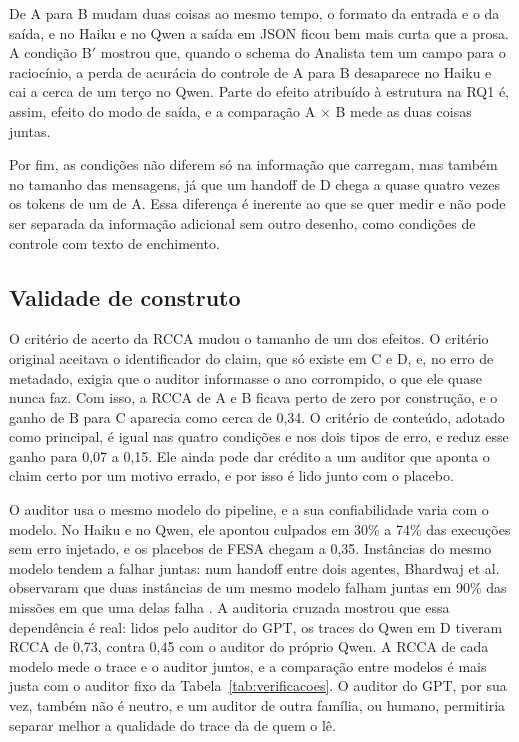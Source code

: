 De A para B mudam duas coisas ao mesmo tempo, o formato da entrada e o da saída, e no Haiku e no Qwen a saída em JSON ficou bem mais curta que a prosa.
A condição B$'$ mostrou que, quando o schema do Analista tem um campo para o raciocínio, a perda de acurácia do controle de A para B desaparece no Haiku e cai a cerca de um terço no Qwen. Parte do efeito atribuído à estrutura na RQ1 é, assim, efeito do modo de saída, e a comparação A $\times$ B mede as duas coisas juntas.

Por fim, as condições não diferem só na informação que carregam, mas também no tamanho das mensagens, já que um handoff de D chega a quase quatro vezes os tokens de um de A.
Essa diferença é inerente ao que se quer medir e não pode ser separada da informação adicional sem outro desenho, como condições de controle com texto de enchimento.

\subsection{Validade de construto}\label{sec:ameacas-construto}

O critério de acerto da RCCA mudou o tamanho de um dos efeitos.
O critério original aceitava o identificador do claim, que só existe em C e D, e, no erro de metadado, exigia que o auditor informasse o ano corrompido, o que ele quase nunca faz. Com isso, a RCCA de A e B ficava perto de zero por construção, e o ganho de B para C aparecia como cerca de 0,34.
O critério de conteúdo, adotado como principal, é igual nas quatro condições e nos dois tipos de erro, e reduz esse ganho para 0,07 a 0,15. Ele ainda pode dar crédito a um auditor que aponta o claim certo por um motivo errado, e por isso é lido junto com o placebo.

O auditor usa o mesmo modelo do pipeline, e a sua confiabilidade varia com o modelo.
No Haiku e no Qwen, ele apontou culpados em 30\% a 74\% das execuções sem erro injetado, e os placebos de FESA chegam a 0,35.
Instâncias do mesmo modelo tendem a falhar juntas: num handoff entre dois agentes, Bhardwaj et al. observaram que duas instâncias de um mesmo modelo falham juntas em 90\% das missões em que uma delas falha \cite{bhardwaj2026contracts}.
A auditoria cruzada mostrou que essa dependência é real: lidos pelo auditor do GPT, os traces do Qwen em D tiveram RCCA de 0,73, contra 0,45 com o auditor do próprio Qwen. A RCCA de cada modelo mede o trace e o auditor juntos, e a comparação entre modelos é mais justa com o auditor fixo da Tabela~\ref{tab:verificacoes}. O auditor do GPT, por sua vez, também não é neutro, e um auditor de outra família, ou humano, permitiria separar melhor a qualidade do trace da de quem o lê.

